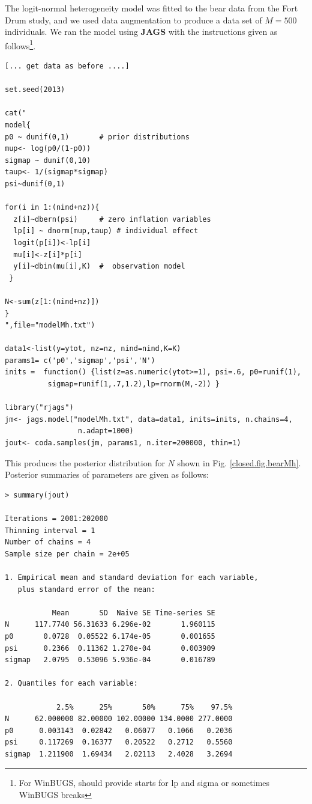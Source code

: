 The logit-normal heterogeneity model was fitted to the bear data from
the Fort Drum study, and we used data augmentation to produce a data
set of $M=500$ individuals.  We ran the model using {\bf JAGS} with
the instructions given as follows\footnote{For WinBUGS, should provide
  starts for lp and sigma or sometimes WinBUGS breaks}.
{\small
\begin{verbatim}
[... get data as before ....]

set.seed(2013)

cat("
model{
p0 ~ dunif(0,1)       # prior distributions
mup<- log(p0/(1-p0))
sigmap ~ dunif(0,10)
taup<- 1/(sigmap*sigmap)
psi~dunif(0,1)

for(i in 1:(nind+nz)){
  z[i]~dbern(psi)     # zero inflation variables
  lp[i] ~ dnorm(mup,taup) # individual effect
  logit(p[i])<-lp[i]
  mu[i]<-z[i]*p[i]
  y[i]~dbin(mu[i],K)  #  observation model
 }

N<-sum(z[1:(nind+nz)])
}
",file="modelMh.txt")

data1<-list(y=ytot, nz=nz, nind=nind,K=K) 
params1= c('p0','sigmap','psi','N')
inits =  function() {list(z=as.numeric(ytot>=1), psi=.6, p0=runif(1),
          sigmap=runif(1,.7,1.2),lp=rnorm(M,-2)) }

library("rjags")
jm<- jags.model("modelMh.txt", data=data1, inits=inits, n.chains=4,
                 n.adapt=1000)
jout<- coda.samples(jm, params1, n.iter=200000, thin=1)
\end{verbatim}
}
This produces the posterior distribution for $N$ shown
in Fig. \ref{closed.fig.bearMh}. Posterior summaries of parameters are
given as follows:
{\small
\begin{verbatim}
> summary(jout)

Iterations = 2001:202000
Thinning interval = 1 
Number of chains = 4 
Sample size per chain = 2e+05 

1. Empirical mean and standard deviation for each variable,
   plus standard error of the mean:

           Mean       SD  Naive SE Time-series SE
N      117.7740 56.31633 6.296e-02       1.960115
p0       0.0728  0.05522 6.174e-05       0.001655
psi      0.2366  0.11362 1.270e-04       0.003909
sigmap   2.0795  0.53096 5.936e-04       0.016789

2. Quantiles for each variable:

            2.5%      25%       50%      75%    97.5%
N      62.000000 82.00000 102.00000 134.0000 277.0000
p0      0.003143  0.02842   0.06077   0.1066   0.2036
psi     0.117269  0.16377   0.20522   0.2712   0.5560
sigmap  1.211900  1.69434   2.02113   2.4028   3.2694
\end{verbatim}
}


